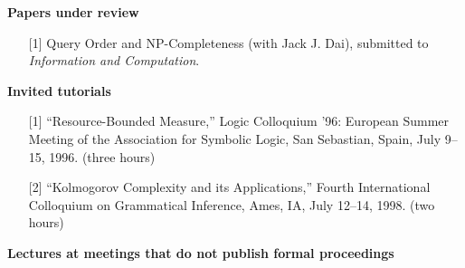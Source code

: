 \vspace*{\bigskipamount}
{\bf Papers under review}

\begin{enumerate}
\item[{[1]}] Query Order and NP-Completeness (with Jack J. Dai),
submitted to {\it Information and Computation}.
\end{enumerate}

\vspace*{\bigskipamount}
{\bf Invited tutorials}

\begin{enumerate}
\item[{[1]}] ``Resource-Bounded Measure,'' Logic Colloquium '96:
European Summer Meeting of the Association for Symbolic Logic,
San Sebastian, Spain, July 9--15, 1996.  (three hours)
\item[{[2]}] ``Kolmogorov Complexity and its Applications,'' 
Fourth International Colloquium on Grammatical Inference,
Ames, IA, July 12--14, 1998.  (two hours)
\end{enumerate}
 
\vspace*{\bigskipamount}
{\bf Lectures at meetings that do not publish formal proceedings}

